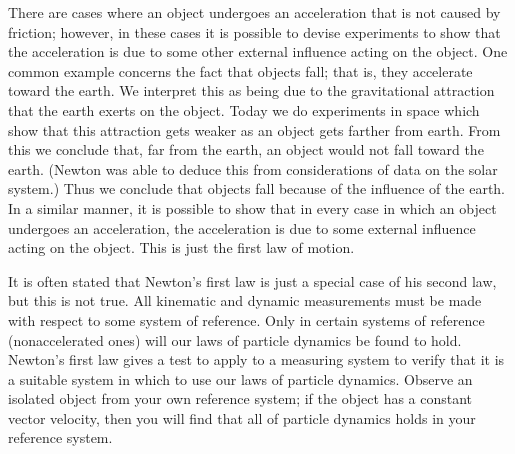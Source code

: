{
There are cases where an object undergoes an acceleration that is not caused
by friction; however, in these cases it is possible to devise experiments to
show that the acceleration is due to some other external influence acting on
the object.
One common example concerns the fact that objects fall; that is, they
accelerate toward the earth.
We interpret this as being due to the gravitational attraction
that the earth exerts on the object.
%
%
Today we do experiments in space which show that this attraction gets weaker
as an object gets farther from earth.
From this we conclude that, far from the earth, an object would not fall
toward the earth.
(Newton was able to deduce this from considerations of data on the solar
system.)
Thus we conclude that objects fall because of the influence of the earth.
In a similar manner, it is possible to show that in every case in which an
object undergoes an acceleration, the acceleration is due to some external
influence acting on the object.
This is just the first law of motion.

It is often stated that Newton's first law is just a special case of his
second law, but this is not true.
All kinematic and dynamic measurements must be made with respect to some
system of reference.
Only in certain systems of reference (nonaccelerated ones) will our laws of
particle dynamics be found to hold.
%
%
Newton's first law gives a test to apply to a measuring system to verify
that it is a suitable system in which to use our laws of particle dynamics.
Observe an isolated object from your own reference system; if the object has
a constant vector velocity, then you will find that all of particle dynamics
holds in your reference system.
}%
%
